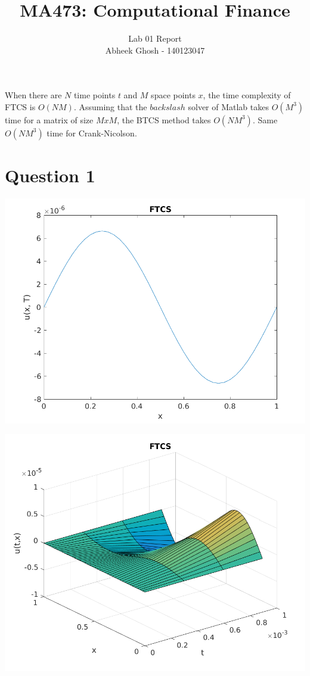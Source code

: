 \documentclass{article}
\begin{document}
	\title{\textbf{MA473: Computational Finance}}
	\author{Lab 01 Report \\ 
		Abheek Ghosh - 140123047 }
	
	\maketitle
	
When there are $N$ time points $t$ and $M$ space points $x$, the time complexity of FTCS is $O(NM)$. Assuming that the $backslash$ solver of Matlab takes $O(M^3)$ time for a matrix of size $MxM$, the BTCS method takes $O(NM^3)$. Same $O(NM^3)$ time for Crank-Nicolson.

\section{Question 1}

\includegraphics{"q1_1"}
\pagebreak

\includegraphics{"q1_2"}
\pagebreak
\end{document}
